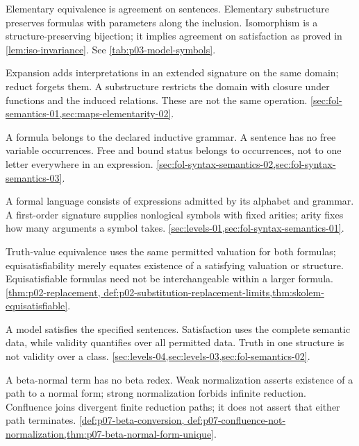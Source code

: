 \begin{description}[style=nextline,leftmargin=0pt]
\item[Elementary equivalence; elementary substructure; isomorphism.]
Elementary equivalence is agreement on sentences. Elementary substructure
preserves formulas with parameters along the inclusion. Isomorphism is
a structure-preserving bijection; it implies agreement on satisfaction
as proved in \cref{lem:iso-invariance}. See \cref{tab:p03-model-symbols}.
\item[Expansion; reduct; substructure.]
Expansion adds interpretations in an extended signature on the same domain;
reduct forgets them. A substructure restricts the domain with closure under
functions and the induced relations. These are not the same operation.
\cref{sec:fol-semantics-01,sec:maps-elementarity-02}.
\item[Formula; sentence; free occurrence.]
A formula belongs to the declared inductive grammar. A sentence has no
free variable occurrences. Free and bound status belongs to occurrences,
not to one letter everywhere in an expression.
\cref{sec:fol-syntax-semantics-02,sec:fol-syntax-semantics-03}.
\item[Language; signature; arity.]
A formal language consists of expressions admitted by its alphabet and
grammar. A first-order signature supplies nonlogical symbols with fixed
arities; arity fixes how many arguments a symbol takes.
\cref{sec:levels-01,sec:fol-syntax-semantics-01}.
\item[Logical equivalence; equisatisfiability.]
Truth-value equivalence uses the same permitted valuation for both formulas;
equisatisfiability merely equates existence of a satisfying valuation or
structure. Equisatisfiable formulas need not be interchangeable within a
larger formula. \cref{thm:p02-replacement,
def:p02-substitution-replacement-limits,thm:skolem-equisatisfiable}.
\item[Model; satisfaction; validity.]
A model satisfies the specified sentences. Satisfaction uses the complete
semantic data, while validity quantifies over all permitted data. Truth in
one structure is not validity over a class.
\cref{sec:levels-04,sec:levels-03,sec:fol-semantics-02}.
\item[Normal form; normalization; confluence.]
A beta-normal term has no beta redex. Weak normalization asserts existence
of a path to a normal form; strong normalization forbids infinite reduction.
Confluence joins divergent finite reduction paths; it does not assert that
either path terminates. \cref{def:p07-beta-conversion,
def:p07-confluence-not-normalization,thm:p07-beta-normal-form-unique}.

\end{description}
